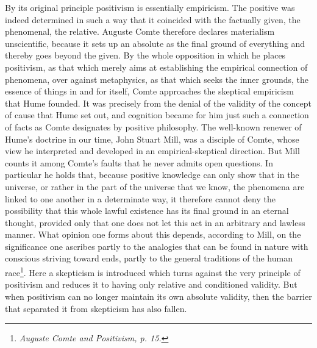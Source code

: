 \documentclass[12pt,a4paper,openany]{book}
\newcommand{\opage}[1]{\marginnote{\footnotesize\textit{[#1]}}}
\begin{document}
By its original principle positivism is essentially
empiricism. The positive was indeed determined in such a way that it coincided
with the factually given, the phenomenal, the relative.
Auguste Comte therefore declares materialism
unscientific, because it sets up an absolute as the final ground
of everything and thereby goes beyond the given. By the whole
opposition in which he places positivism, as that which merely
\opage{205}aims at establishing the empirical connection of phenomena,
over against metaphysics, as that which seeks the inner grounds,
the essence of things in and for itself, Comte approaches the skeptical
empiricism that Hume founded. It
was precisely from the denial of the validity of the concept of cause
that Hume set out, and cognition became for him just such a
connection of facts as Comte designates by positive philosophy.
The well-known renewer of Hume's doctrine in our time, John
Stuart Mill, was a disciple of Comte, whose view he
interpreted and developed in an empirical-skeptical direction. But Mill
counts it among Comte's faults that he never admits
open questions. In particular he holds that, because
positive knowledge can only show that in the universe, or rather in the
part of the universe that we know, the phenomena are linked
to one another in a determinate way, it therefore cannot deny
the possibility that this whole lawful existence has its
final ground in an eternal thought, provided only that one does not let
this act in an arbitrary and lawless manner. What opinion
one forms about this depends, according to Mill, on the significance
one ascribes partly to the analogies that can be found in
nature with conscious striving toward ends, partly to
the general traditions of the human race\footnote{\textit{Auguste Comte and Positivism, p. 15.}}. Here
a skepticism is introduced which turns against the very principle of
positivism and reduces it to having only relative and conditioned
validity. But when positivism can no longer maintain
its own absolute validity, then the barrier that separated
it from skepticism has also fallen.
\end{document}
